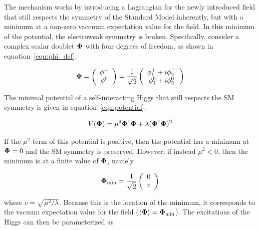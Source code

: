 The mechanism works by introducing a Lagrangian for the newly introduced field that still respects the symmetry of the Standard Model inherently, but with a minimum at a non-zero vaccuum expectation value for the field. In this minimum of the potential, the electroweak symmetry is broken. Specifically, consider a complex scalar doublet $\mathbf{\Phi}$ with four degrees of freedom, as shown in equation~\ref{eqn:phi_def}.

\begin{equation}
\label{eqn:phi_def}
\mathbf{\Phi} = \left( \begin{array}{c} \phi^+ \\ \phi^0 \end{array} \right) = \frac{1}{\sqrt{2}}\left( \begin{array}{c} \phi_{1}^{+} + i\phi_{2}^+ \\ \phi_1^0 + i\phi_2^0 \end{array} \right)
\end{equation}

The minimal potential of a self-interacting Higgs that still respects the SM symmetry is given in equation~\ref{eqn:potential}.

\begin{equation}
\label{eqn:potential}
V(\mathbf{\Phi}) = \mu^2 \mathbf{\Phi}^{\dagger}\mathbf{\Phi} + \lambda(\mathbf{\Phi}^\dagger\mathbf{\Phi})^2
\end{equation}

If the $\mu^2$ term of this potential is positive, then the potential has a minimum at $\mathbf{\Phi} = 0$ and the SM symmetry is preserved. However, if instead $\mu^2 < 0$, then the minimum is at a finite value of $\mathbf{\Phi}$, namely

\begin{equation}
\mathbf{\Phi}_{\rm min} = \frac{1}{\sqrt{2}} \left(\begin{array}{c} 0 \\ v\end{array} \right)
\end{equation}

where $v = \sqrt{\mu^2/\lambda}$. Because this is the location of the minimum, it corresponds to the vacuum expectation value for the field ($\langle\mathbf{\Phi}\rangle = \mathbf{\Phi}_{\rm min}$). The excitations of the Higgs can then be parameterized as 

